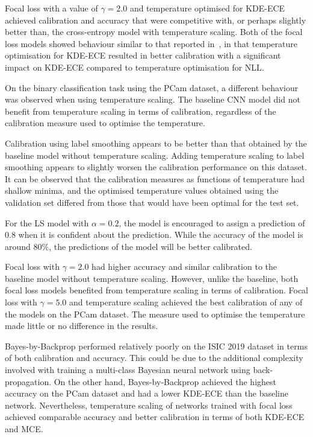 Focal loss with a value of $\gamma = 2.0$ and temperature optimised for KDE-ECE achieved calibration and accuracy that were competitive with, or perhaps slightly better than, the cross-entropy model with temperature scaling. Both of the focal loss models showed behaviour similar to that reported in~\cite{mukhoti2020calibrating}, in that temperature optimisation for KDE-ECE resulted in better calibration with a significant impact on KDE-ECE compared to temperature optimisation for NLL.

On the binary classification task using the PCam dataset, a different behaviour was observed when using temperature scaling. The baseline CNN model did not benefit from temperature scaling in terms of calibration, regardless of the calibration measure used to optimise the temperature.

Calibration using label smoothing appears to be better than that obtained by the baseline model without temperature scaling. Adding temperature scaling to label smoothing appears to slightly worsen the calibration performance on this dataset. It can be observed that the calibration measures as functions of temperature had shallow minima, and the optimised temperature values obtained using the validation set differed from those that would have been optimal for the test set.

For the LS model with $\alpha=0.2$, the model is encouraged to assign a prediction of 0.8 when it is confident about the prediction. While the accuracy of the model is around 80\%, the predictions of the model will be better calibrated.

Focal loss with $\gamma = 2.0$ had higher accuracy and similar calibration to the baseline model without temperature scaling. However, unlike the baseline, both focal loss models benefited from temperature scaling in terms of calibration. Focal loss with $\gamma = 5.0$ and temperature scaling achieved the best calibration of any of the models on the PCam dataset. The measure used to optimise the temperature made little or no difference in the results.

Bayes-by-Backprop performed relatively poorly on the ISIC 2019 dataset in terms of both calibration and accuracy. This could be due to the additional complexity involved with training a multi-class Bayesian neural network using back-propagation. On the other hand, Bayes-by-Backprop achieved the highest accuracy on the PCam dataset and had a lower KDE-ECE than the baseline network. Nevertheless, temperature scaling of networks trained with focal loss achieved comparable accuracy and better calibration in terms of both KDE-ECE and MCE.

